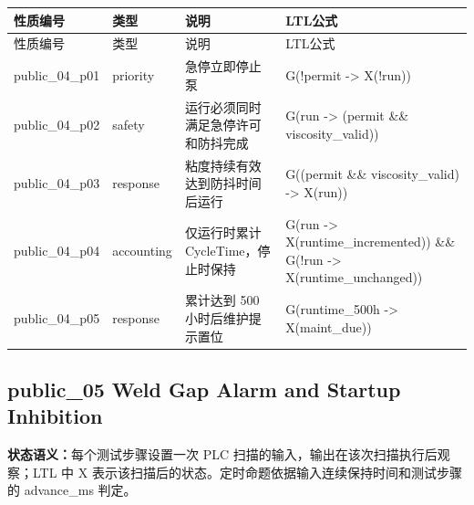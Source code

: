\begin{longtable}{L{2.3cm}L{1.7cm}L{4.1cm}L{5.2cm}}

\toprule

性质编号 & 类型 & 说明 & LTL公式\\

\midrule

\endfirsthead

\toprule

性质编号 & 类型 & 说明 & LTL公式\\

\midrule

\endhead

{\ttfamily public\_04\_p01} & priority & 急停立即停止泵 & {\ttfamily G(!permit -> X(!run))}\\

{\ttfamily public\_04\_p02} & safety & 运行必须同时满足急停许可和防抖完成 & {\ttfamily G(run -> (permit \&\& viscosity\_valid))}\\

{\ttfamily public\_04\_p03} & response & 粘度持续有效达到防抖时间后运行 & {\ttfamily G((permit \&\& viscosity\_valid) -> X(run))}\\

{\ttfamily public\_04\_p04} & accounting & 仅运行时累计 CycleTime，停止时保持 & {\ttfamily G(run -> X(runtime\_incremented)) \&\& G(!run -> X(runtime\_unchanged))}\\

{\ttfamily public\_04\_p05} & response & 累计达到 500 小时后维护提示置位 & {\ttfamily G(runtime\_500h -> X(maint\_due))}\\

\bottomrule

\end{longtable}

\subsection{{\ttfamily public\_05} Weld Gap Alarm and Startup Inhibition}

\noindent\textbf{状态语义：}每个测试步骤设置一次 PLC 扫描的输入，输出在该次扫描执行后观察；LTL 中 X 表示该扫描后的状态。定时命题依据输入连续保持时间和测试步骤的 advance\_ms 判定。

